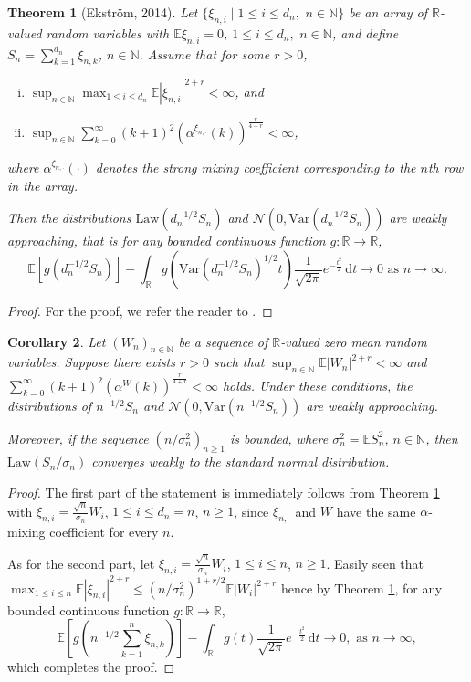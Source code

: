 \documentclass[a4paper,10pt]{article}
\newtheorem{theorem}{Theorem}[section]
\newtheorem{corollary}[theorem]{Corollary}
\newcommand{\N}{\mathbb{N}}
\newcommand{\R}{\mathbb{R}}
\newcommand{\E}{\mathbb{E}}
\newcommand{\law}[1]{\text{Law}(#1)}
\newcommand{\var}{\mathrm{Var}}
\newcommand{\dint}{\mathrm{d}}  %
\begin{document}
\begin{theorem}[Ekstr\"om, 2014]\label{thm:Ekstrom}
	Let $\{\xi_{n,i}\mid 1\le i\le d_n,\,\,n\in\N\}$ be an array of $\R$-valued random variables with $\E \xi_{n,i} = 0$, $1\le i\le d_n,\,\,n\in\N$, and define $S_n=\sum_{k=1}^{d_n} \xi_{n,k}$, $n\in\N$.
	Assume that for some $r>0$, 
	\begin{enumerate}[i.]
		\item $\displaystyle{\sup_{n\in\N}\max_{1\le i\le d_n} \E |\xi_{n,i}|^{2+r}<\infty}$, and
		
		\item $\sup_{n\in\N}\sum_{k=0}^{\infty}(k+1)^2 \left(\alpha^{\xi_{n,\cdot}} (k)\right)^{\frac{r}{4+r}}<\infty$,
	\end{enumerate} 
	where $\alpha^{\xi_{n,\cdot}} (\cdot)$ denotes the strong mixing coefficient corresponding to the $n$th row in the array.
	
	Then the distributions $\law{d_n^{-1/2}S_n}$ and $\mathcal{N}(0,\var (d_n^{-1/2}S_n))$ are \emph{weakly approaching}, that is for any bounded continuous function $g:\R\to\R$,
	$$
	\E \left[g\left(d_n^{-1/2}S_n\right)\right] - 
	\int_{\R} g\left(\var (d_n^{-1/2}S_n)^{1/2}t\right)\frac{1}{\sqrt{2\pi}}e^{-\frac{t^2}{2}}\,\dint t
	\to 0\,\,\text{as}\,\,n\to\infty.
	$$
\end{theorem}
\begin{proof}
	For the proof, we refer the reader to \cite{ekstrom2014general}.
\end{proof}

\begin{corollary}\label{cor:ekstrom}
	Let $(W_n)_{n\in\N}$ be a sequence of $\R$-valued zero mean random variables.
	Suppose there exists $r>0$ such that $\sup_{n\in\N}\E |W_n|^{2+r}<\infty$ and $\sum_{k=0}^{\infty}(k+1)^2 \left(\alpha^{W} (k)\right)^{\frac{r}{4+r}}<\infty$ holds.
	Under these conditions, the distributions of $n^{-1/2}S_n$ and $\mathcal{N}(0,\var(n^{-1/2}S_n))$ are weakly approaching.
	
	Moreover, if the sequence $(n/\sigma_n^2)_{n\ge 1}$ is bounded, where $\sigma_n^2=\E S_n^2$, $n\in\N$, then $\law{S_n/\sigma_n}$ converges weakly to the standard normal distribution.
\end{corollary}
\begin{proof}
	The first part of the statement is immediately follows from Theorem \ref{thm:Ekstrom} with
	$\xi_{n,i}=\frac{\sqrt{n}}{\sigma_n}W_i$, $1\le i\le d_n=n$, $n\ge 1$, since $\xi_{n,\cdot}$ and $W$ have the same $\alpha$-mixing coefficient for every $n$.
	
	As for the second part, let $\xi_{n,i}=\frac{\sqrt{n}}{\sigma_n}W_i$, $1\le i\le n$, $n\ge 1$. Easily seen that $\max_{1\le i\le n}\E |\xi_{n,i}|^{2+r}\le (n/\sigma_n^2)^{1+r/2}\E |W_i|^{2+r}$ hence by Theorem \ref{thm:Ekstrom}, for any bounded continuous function $g:\R\to\R$,
	$$
	\E \left[g\left(n^{-1/2}\sum_{k=1}^{n}\xi_{n,k}\right)\right] - 
	\int_{\R} g (t)\frac{1}{\sqrt{2\pi}}e^{-\frac{t^2}{2}}\,\dint t
	\to 0,\,\,\text{as}\,\,n\to\infty,
	$$
	which completes the proof.
\end{proof}
\end{document}

